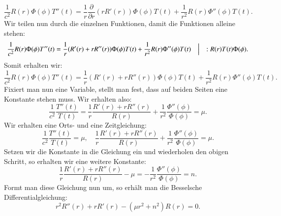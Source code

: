 \begin{equation}
\frac{1}{c^2} R(r) \Phi(\phi) T''(t) = \frac{1}{r} \frac{\partial}{\partial r}(r R'(r)) \Phi(\phi) T(t) + \frac{1}{r^2} R(r) \Phi''(\phi) T(t)
.
\end{equation}
Wir teilen nun durch die einzelnen Funktionen, damit die Funktionen alleine stehen:
\begin{equation}
\frac{1}{c^2} R(r) \Phi(\phi) T''(t) = \frac{1}{r}(R'(r) + rR''(r)) \Phi(\phi) T(t) + \frac{1}{r^2} R(r) \Phi''(\phi) T(t)
\quad
\Bigl\lvert\quad
:R(r)T(t)\Phi(\phi)
.
\end{equation}
Somit erhalten wir:
\begin{equation}
\frac{1}{c^2} R(r) \Phi(\phi) T''(t) = \frac{1}{r} (R'(r) + rR''(r)) \Phi(\phi) T(t) + \frac{1}{r^2} R(r) \Phi''(\phi) T(t)
.
\end{equation}
Fixiert man nun eine Variable, stellt man fest, dass auf beiden Seiten eine Konstante stehen muss. Wir erhalten also:
\begin{equation}
\frac{1}{c^2}
\frac{T''(t)}{T(t)} = 
\frac{1}{r} 
\frac{R'(r) + rR''(r)}{R(r)} + 
\frac{1}{r^2}
\frac{\Phi''(\phi)}{\Phi(\phi)} = \mu.
\end{equation}
Wir erhalten eine Orts- und eine Zeitgleichung:
\begin{equation}
\frac{1}{c^2} 
\frac{T''(t)}{T(t)} = 
\mu
,\quad
\frac{1}{r} \frac{R'(r) + rR''(r)}{R(r)} + 
\frac{1}{r^2} \frac{\Phi''(\phi)}{\Phi(\phi)} = 
\mu
.
\label{eq:separiertegleichung}
\end{equation}
Setzen wir die Konstante in die Gleichung ein und wiederholen den obigen Schritt, so erhalten wir eine weitere Konstante:
\begin{equation}
\frac{1}{r} \frac{R'(r) + rR''(r)}{R(r)} - \mu =
-\frac{1}{r^2} \frac{\Phi''(\phi)}{\Phi(\phi)} = n
.
\end{equation}
Formt man diese Gleichung nun um, so erhält man die Besselsche Differentialgleichung:
\begin{equation}
r^2 R''(r) + r R'(r) - (\mu r^2 + n^2)R(r) = 0
\label{eq:besselsche_dgl}
.
\end{equation}
